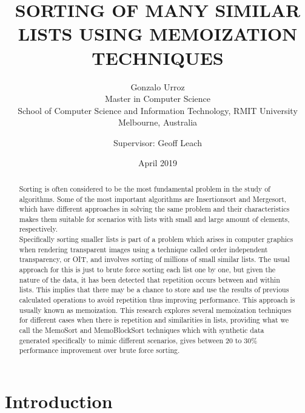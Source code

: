 \documentclass[a4paper,12pt]{article}
\begin{document}
\title{\uppercase{Sorting of many similar lists using memoization techniques}} 
\author{Gonzalo Urroz\\
{\small Master in Computer Science }\\
{\small School of Computer Science and Information Technology, RMIT University } \\
{\small Melbourne, Australia }\\
\and Supervisor: Geoff Leach
}

\date{April 2019}
\maketitle

\begin{abstract}
Sorting is often considered to be the most fundamental problem in the study of algorithms. Some of the most important algorithms are Insertionsort and Mergesort, which have different approaches in solving the same problem and their characteristics makes them suitable for scenarios with lists with small and large amount of elements, respectively. \\
Specifically sorting smaller lists is part of a problem which arises in computer graphics when rendering transparent images using a technique called order independent transparency, or OIT, and involves sorting of millions of small similar lists. The usual approach for this is just to brute force sorting each list one by one, but given the nature of the data, it has been detected that repetition occurs between and within lists. This implies that there may be a chance to store and use the results of previous calculated operations to avoid repetition thus improving performance. This approach is usually known as memoization. 
This research explores several memoization techniques for different cases when there is repetition and similarities in lists, providing what we call the MemoSort and MemoBlockSort techniques which with synthetic data generated specifically to mimic different scenarios, gives between 20 to 30\% performance improvement over brute force sorting.

\end{abstract}

\newpage
\tableofcontents
\newpage

\section{Introduction}
\end{document}
